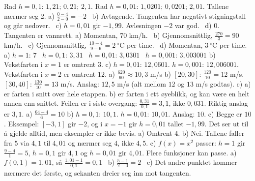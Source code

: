  Rad $h = 0,1$: $1,21$; $0,21$; $2,1$. Rad $h = 0,01$: $1,0201$; $0,0201$; $2,01$. Tallene nærmer seg $2$.
 a) $\frac{0 - 4}{2 - 0} = -2$ \ b) Avtagende. Tangenten har negativt stigningstall og går nedover. \ c) $h = 0,01$ gir $-1,99$. Avlesningen $-2$ var god. \ d) $0$. Tangenten er vannrett.
 a) Momentan, $70$ km/h. \ b) Gjennomsnittlig, $\frac{270}{3} = 90$ km/h. \ c) Gjennomsnittlig, $\frac{10 - 4}{9 - 6} = 2\ {}^\circ$C per time. \ d) Momentan, $3\ {}^\circ$C per time.
 a) $h = 1$: $7$ \ $h = 0,1$: $3,31$ \ $h = 0,01$: $3,0301$ \ $h = 0,001$: $3,003001$
b) Vekstfarten i $x = 1$ er omtrent $3$.
c) $h = 0,01$: $12,0601$. $h = 0,001$: $12,006001$. Vekstfarten i $x = 2$ er omtrent $12$.
 a) $\frac{620}{60} \approx 10,3$ m/s
b) $[20, 30]$: $\frac{120}{10} = 12$ m/s. $[30, 40]$: $\frac{130}{10} = 13$ m/s. Anslag: $12,5$ m/s (alt mellom $12$ og $13$ m/s godtas).
c) a) er farten i snitt over hele etappen. b) er farten i ett øyeblikk, og kan være en helt annen enn snittet.
 Feilen er i siste overgang: $\frac{0,31}{0,1} = 3,1$, ikke $0,031$. Riktig anslag er $3,1$.
 a) $\frac{64 - 4}{6} = 10$
b) $h = 0,1$: $10,1$. $h = 0,01$: $10,01$. Anslag: $10$.
c) Begge er $10$. Eksempel: $[-3, 1]$ gir $-2$, og i $x = -1$ gir $h = 0,01$ tallet $-1,99$. Det ser ut til å gjelde alltid, men eksempler er ikke bevis.
 a) Omtrent $4$.
b) Nei. Tallene faller fra $5$ via $4,1$ til $4,01$ og nærmer seg $4$, ikke $4,5$.
c) $f(x) = x^2$ passer: $h = 1$ gir $\frac{9 - 4}{1} = 5$, $h = 0,1$ gir $4,1$ og $h = 0,01$ gir $4,01$. Flere funksjoner kan passe.
 a) $f(0,1) = 1,01$, så $\frac{1,01 - 1}{0,1} = 0,1$ \ b) $\frac{5 - 1}{2 - 0} = 2$ \ c) Det andre punktet kommer nærmere det første, og sekanten dreier seg inn mot tangenten.

